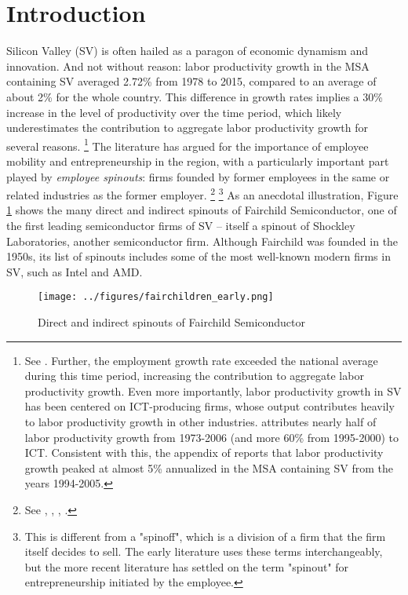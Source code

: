 \documentclass[12pt,english]{article}
\theoremstyle{remark}
\begin{document}
\section{Introduction}



Silicon Valley (SV) is often hailed as a paragon of economic dynamism and innovation. And not without reason: labor productivity growth in the MSA containing SV averaged 2.72\% from 1978 to 2015, compared to an average of about 2\% for the whole country. This difference in growth rates implies a 30\% increase in the level of productivity over the time period, which likely underestimates the contribution to aggregate labor productivity growth for several reasons. \footnote{See \cite{parilla_understanding_2017}. Further, the employment growth rate exceeded the national average during this time period, increasing the contribution to aggregate labor productivity growth. Even more importantly, labor productivity growth in SV has been centered on ICT-producing firms, whose output contributes heavily to labor productivity growth in other industries. \cite{jorgenson_retrospective_2008} attributes nearly half of labor productivity growth from 1973-2006 (and more 60\% from 1995-2000) to ICT. Consistent with this, the appendix of  \cite{parilla_understanding_2017} reports that labor productivity growth peaked at almost 5\% annualized in the MSA containing SV from the years 1994-2005.} The literature has argued for the importance of employee mobility and entrepreneurship in the region, with a particularly important part played by \textit{employee spinouts}: firms founded by former employees in the same or related industries as the former employer. \footnote{See \cite{saxenian_regional_1994}, \cite{gilson_legal_1999}, \cite{fallick_job-hopping_2006}, \cite{franco_covenants_2008}.} \footnote{This is different from a "spinoff", which is a division of a firm that the firm itself decides to sell. The early literature uses these terms interchangeably, but the more recent literature has settled on the term "spinout" for entrepreneurship initiated by the employee.} As an anecdotal illustration, Figure \ref{fairchild_spinouts} shows the many direct and indirect spinouts of Fairchild Semiconductor, one of the first leading semiconductor firms of SV -- itself a spinout of Shockley Laboratories, another semiconductor firm. Although Fairchild was founded in the 1950s, its list of spinouts includes some of the most well-known modern firms in SV, such as Intel and AMD. 

\begin{figure}	
	\center
	\texttt{[image: ../figures/fairchildren\_early.png]}
	\caption{Direct and indirect spinouts of Fairchild Semiconductor}
	\label{fairchild_spinouts}
\end{figure}
\end{document}
